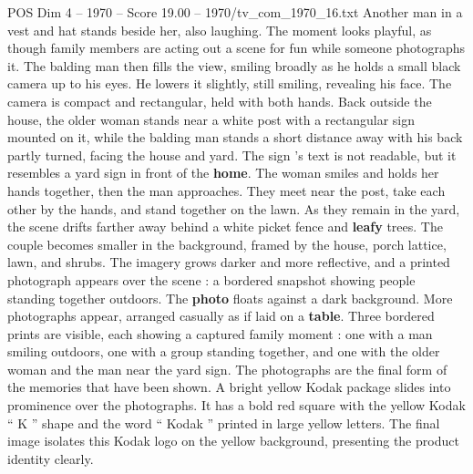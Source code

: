 \begin{textsample}{POS Dim 4 – 1970 – Score 19.00 – 1970/tv\_com\_1970\_16.txt}
Another man in a vest and hat stands beside her, also laughing.
The moment looks playful, as though family members are acting out a scene for fun while someone photographs it.
The balding man then fills the view, smiling broadly as he holds a small black camera up to his eyes.
He lowers it slightly, still smiling, revealing his face.
The camera is compact and rectangular, held with both hands.
Back outside the house, the older woman stands near a white post with a rectangular sign mounted on it, while the balding man stands a short distance away with his back partly turned, facing the house and yard.
The sign ’s text is not readable, but it resembles a yard sign in front of the \textbf{home}.
The woman smiles and holds her hands together, then the man approaches.
They meet near the post, take each other by the hands, and stand together on the lawn.
As they remain in the yard, the scene drifts farther away behind a white picket fence and \textbf{leafy} trees.
The couple becomes smaller in the background, framed by the house, porch lattice, lawn, and shrubs.
The imagery grows darker and more reflective, and a printed photograph appears over the scene : a bordered snapshot showing people standing together outdoors.
The \textbf{photo} floats against a dark background.
More photographs appear, arranged casually as if laid on a \textbf{table}.
Three bordered prints are visible, each showing a captured family moment : one with a man smiling outdoors, one with a group standing together, and one with the older woman and the man near the yard sign.
The photographs are the final form of the memories that have been shown.
A bright yellow Kodak package slides into prominence over the photographs.
It has a bold red square with the yellow Kodak “ K ” shape and the word “ Kodak ” printed in large yellow letters.
The final image isolates this Kodak logo on the yellow background, presenting the product identity clearly.

\end{textsample}
